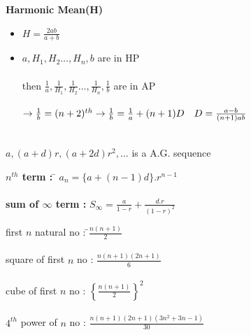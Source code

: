 \documentclass[11pt,a4paper,landscape]{article}
\begin{document}
\begin{multicols}{3}
{\bfseries \noindent Harmonic Mean(H)}
\begin{itemize}
	\item $H = \frac{2ab}{a+b}$
	\item $a,H_1,H_2 \ldots,H_n,b$ are in HP\\ \\
		then $\frac{1}{a},\frac{1}{H_1},\frac{1}{H_2} \ldots,\frac{1}{H_n},\frac{1}{b}$ are in AP\\ \\
		$\rightarrow \frac{1}{b} = (n+2)^{th} \\ \\ \rightarrow \frac{1}{b} = \frac{1}{a}+(n+1)D \quad D =\frac{a-b}{(n+1)ab\\ \\}$
\end{itemize}

{\bfseries {}}\\
$a,(a+d)r,(a+2d)r^2,\ldots$ is a A.G. sequence
\begin{tabbing}
{\bfseries $n^{th}$ term :} \hspace{15mm} \= $a_n = \{a+(n-1)d\}.r^{n-1}$ \\ \\
{\bfseries sum of  $\infty$ term :} \>$S_{\infty} = \frac{a}{1-r}+\frac{d.r}{{(1-r)}^{2}}$ \\
\end{tabbing}

{\bfseries {}}
\begin{tabbing}
first $n$ natural no : \hspace{5mm}\=$\frac{n(n+1)}{2}$\\ \\
square of first $n$ no : \> $\frac{n(n+1)(2n+1)}{6}$\\ \\
cube of first $n$ no : \> ${\left \{ \frac{n(n+1)}{2} \right \} }^2$\\\\
$4^{th}$ power of $n$ no : \> $\frac{n(n+1)(2n+1)(3n^{2}+3n-1)}{30}$
\end{tabbing}
\end{multicols}
\pagebreak
\end{document}
